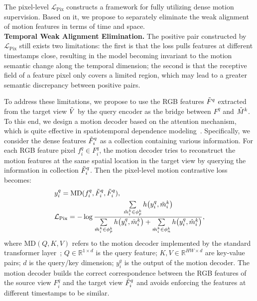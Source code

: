 \documentclass[sigconf,screen]{acmart}
\begin{document}
The pixel-level $\mathcal{L}_{\mathrm{Pix}}$ constructs a framework for fully utilizing dense motion supervision. Based on it, we propose to separately eliminate the weak alignment of motion features in terms of time and space.\\
{\bf Temporal Weak Alignment Elimination.} The positive pair constructed by $\mathcal{L}_{\mathrm{Pix}}$ still exists two limitations: the first is that the loss pulls features at different timestamps close, resulting in the model becoming invariant to the motion semantic change along the temporal dimension; the second is that the receptive field of a feature pixel only covers a limited region, which may lead to a greater semantic discrepancy between positive pairs.

To address these limitations, we propose to use the RGB features $\Tilde{F}^q$ extracted from the target view $\Tilde{V}$ by the query encoder as the bridge between $F^q$ and $\Tilde{M}^k$. To this end, we design a motion decoder based on the attention mechanism, which is quite effective in spatiotemporal dependence modeling~\cite{Non-local,Contextualized,ViViT,TimeSformer}.
Specifically, we consider the dense features $\Tilde{F}_i^q$ as a collection containing various information. For each RGB feature pixel $f_i^q \in F_i^q$, the motion decoder tries to reconstruct the motion features at the same spatial location in the target view by querying the information in collection $\Tilde{F}_i^q$. Then the pixel-level motion contrastive loss becomes:
\begin{align}
& y_i^q = \mathrm{MD}(f_i^q,\Tilde{F}_i^q,\Tilde{F}_i^q), \\
& \mathcal{L}_{\mathrm{Pix}} = -\log \frac{\sum\limits_{\Tilde{m}_i^k \in \phi_p^k} h\big(y_i^q, \Tilde{m}_i^k\big)}{\sum\limits_{\Tilde{m}_i^k \in \phi_p^k} h\big(y_i^q, \Tilde{m}_i^k\big)+\sum\limits_{\hat{m}_i^k \in \phi_n^k} h\big(y_i^q, \hat{m}_i^k\big)},
\end{align}
where $\mathrm{MD}(Q,K,V)$ refers to the motion decoder implemented by the standard transformer layer~\cite{attention}; $Q \in \mathbb{R}^{1 \times d}$ is the query feature; $K,V \in \mathbb{R}^{HW \times d}$ are key-value pairs; $d$ is the query/key dimension; $y_i^q$ is the output of the motion decoder.
The motion decoder builds the correct correspondence between the RGB features of the source view $F_i^q$ and the target view $\Tilde{F}_i^q$ and avoids enforcing the features at different timestamps to be similar.
\end{document}
